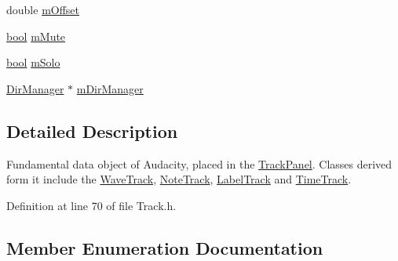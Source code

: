 \begin{DoxyCompactItemize}
\item 
double \hyperlink{class_track_a561704af11450071df74b62498a54d1a}{m\+Offset}
\item 
\hyperlink{mac_2config_2i386_2lib-src_2libsoxr_2soxr-config_8h_abb452686968e48b67397da5f97445f5b}{bool} \hyperlink{class_track_a633f85ffde8eda30576b00ee4115570c}{m\+Mute}
\item 
\hyperlink{mac_2config_2i386_2lib-src_2libsoxr_2soxr-config_8h_abb452686968e48b67397da5f97445f5b}{bool} \hyperlink{class_track_ab21eed7b5982622ba28451c5f76d3156}{m\+Solo}
\item 
\hyperlink{class_dir_manager}{Dir\+Manager} $\ast$ \hyperlink{class_track_ac8edb91d41baf41462a0e1ee9a6c52a0}{m\+Dir\+Manager}
\end{DoxyCompactItemize}


\subsection{Detailed Description}
Fundamental data object of Audacity, placed in the \hyperlink{class_track_panel}{Track\+Panel}. Classes derived form it include the \hyperlink{class_wave_track}{Wave\+Track}, \hyperlink{class_note_track}{Note\+Track}, \hyperlink{class_label_track}{Label\+Track} and \hyperlink{class_time_track}{Time\+Track}. 

Definition at line 70 of file Track.\+h.



\subsection{Member Enumeration Documentation}
